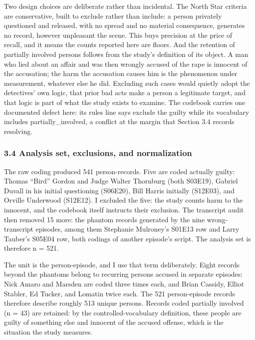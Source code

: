 \documentclass[
]{article}
\begin{document}
Two design choices are deliberate rather than incidental. The North Star
criteria are conservative, built to exclude rather than include: a
person privately questioned and released, with no spread and no material
consequence, generates no record, however unpleasant the scene. This
buys precision at the price of recall, and it means the counts reported
here are floors. And the retention of partially involved persons follows
from the study's definition of its object. A man who lied about an
affair and was then wrongly accused of the rape is innocent of the
accusation; the harm the accusation causes him is the phenomenon under
measurement, whatever else he did. Excluding such cases would quietly
adopt the detectives' own logic, that prior bad acts make a person a
legitimate target, and that logic is part of what the study exists to
examine. The codebook carries one documented defect here: its rules line
says exclude the guilty while its vocabulary includes
partially\_involved, a conflict at the margin that Section 3.4 records
resolving.

\subsubsection{3.4 Analysis set, exclusions, and
normalization}\label{analysis-set-exclusions-and-normalization}

The raw coding produced 541 person-records. Five are coded actually
guilty: Thomas ``Bird'' Gordon and Judge Walter Thornburg (both S03E19),
Gabriel Duvall in his initial questioning (S06E20), Bill Harris
initially (S12E03), and Orville Underwood (S12E12). I excluded the five:
the study counts harm to the innocent, and the codebook itself instructs
their exclusion. The transcript audit then removed 15 more: the phantom
records generated by the nine wrong-transcript episodes, among them
Stephanie Mulroney's S01E13 row and Larry Tauber's S05E04 row, both
codings of another episode's script. The analysis set is therefore n =
521.

The unit is the person-episode, and I use that term deliberately. Eight
records beyond the phantoms belong to recurring persons accused in
separate episodes: Nick Amaro and Marsden are coded three times each,
and Brian Cassidy, Elliot Stabler, Ed Tucker, and Lomatin twice each.
The 521 person-episode records therefore describe roughly 513 unique
persons. Records coded partially involved (n = 43) are retained: by the
controlled-vocabulary definition, these people are guilty of something
else and innocent of the accused offense, which is the situation the
study measures.
\end{document}

